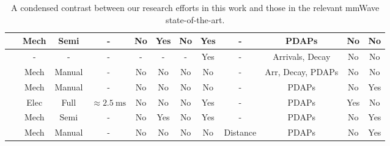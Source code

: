 \documentclass[12pt, draftcls, onecolumn]{IEEEtran}
\begin{document}
\begin{table}
\begin{tabular}{|*{12}{c|}}
    \hline
   ~\cite{PDAPs} & Mech & Semi & - & No & Yes & No & Yes & - & PDAPs & No & No\\
    \hline
   ~\cite{Indoor60G} & - & - & - & - & - & - & Yes & - & Arrivals, Decay & No & No\\
    \hline
   ~\cite{QDC_NIST} & Mech & Manual & - & No & No & No & No & - & Arr, Decay, PDAPs & No & No\\
    \hline
   ~\cite{D2DHumanBlockage} & Mech & Manual & - & No & No & No & No & - & PDAPs & No & Yes\\
    \hline
   ~\cite{DopplerHST} & Elec & Full & ${\approx}\SI{2.5}{\milli\second}$ & No & No & No & Yes & - & PDAPs & Yes & No\\
    \hline
   ~\cite{V2XBlockages} & Mech & Semi & - & No & Yes & No & Yes & - & PDAPs & No & Yes\\
    \hline
   ~\cite{MacCartneyUrbanHumanBlockage} & Mech & Manual & - & No & No & No & No & Distance & PDAPs & No & Yes\\
    \hline
    \end{tabular}
    \vspace{-1mm}
    \caption{A condensed contrast between our research efforts in this work and those in the relevant mmWave state-of-the-art.}
    \label{T2}
\end{table}
\end{document}
